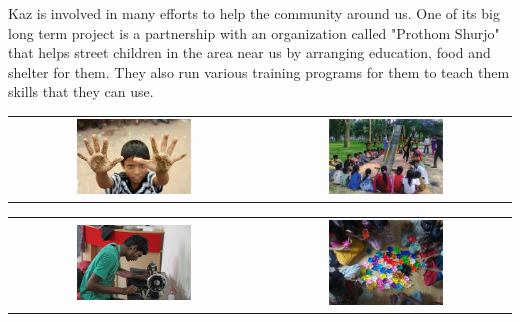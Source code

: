 Kaz is involved in many efforts to help the community around us.
One of its big long term project is a partnership with an organization called "Prothom Shurjo" that helps street children in the area near us by arranging education, food and shelter for them.
They also run various training programs for them to teach them skills that they can use.

\setlength{\tabcolsep}{4pt}

\begin{center}
    \begin{tabular}{cc}
    \includegraphics[width=0.475\textwidth]{images/Chapter2/help1.png} & \includegraphics[width=0.475\textwidth]{images/Chapter2/help2.png}
    \end{tabular}
\end{center}

\begin{center}
    \begin{tabular}{cc}
    \includegraphics[width=0.475\textwidth]{images/Chapter2/help3.png} & \includegraphics[width=0.475\textwidth]{images/Chapter2/help4.png}
    \end{tabular}
\end{center}

